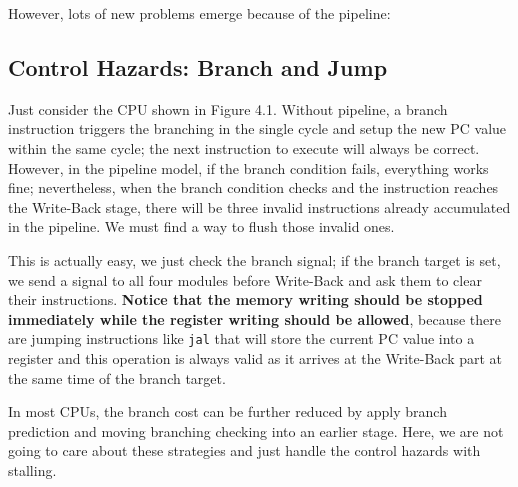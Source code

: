 \documentclass[a4paper,12pt, oneside]{book}
\begin{document}
However, lots of new problems emerge because of the pipeline:
\subsection{Control Hazards: Branch and Jump}
Just consider the CPU shown in Figure 4.1. Without pipeline, a branch instruction triggers the branching in the single cycle and setup the new PC value within the same cycle; the next instruction to execute will always be correct. However, in the pipeline model, if the branch condition fails, everything works fine; nevertheless, when the branch condition checks and the instruction reaches the Write-Back stage, there will be three invalid instructions already accumulated in the pipeline. We must find a way to flush those invalid ones.

This is actually easy, we just check the branch signal; if the branch target is set, we send a signal to all four modules before Write-Back and ask them to clear their instructions. \textbf{Notice that the memory writing should be stopped immediately while the register writing should be allowed}, because there are jumping instructions like \texttt{jal} that will store the current PC value into a register and this operation is always valid as it arrives at the Write-Back part at the same time of the branch target.

In most CPUs, the branch cost can be further reduced by apply branch prediction and moving branching checking into an earlier stage. Here, we are not going to care about these strategies and just handle the control hazards with stalling.
\end{document}
